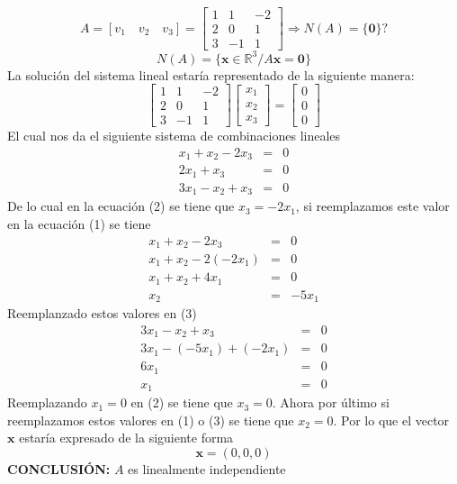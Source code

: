 \[
A = [ {v}_{1} \quad {v}_{2} \quad {v}_{3} ] =
\begin{bmatrix}
1 & 1 & -2 \\ 
2 & 0 & 1 \\
3 & -1 & 1
\end{bmatrix}
\Longrightarrow N(A) = \{ \mathbf{0} \} ?
\]
$$
N(A) = \{ \mathbf{x} \in \mathbb{R}^3 / A \mathbf{x} = \mathbf{0} \}
$$
La solución del sistema lineal estaría representado de la siguiente manera:
\[
\begin{bmatrix}
1 & 1 & -2 \\ 
2 & 0 & 1 \\
3 & -1 & 1
\end{bmatrix}
\begin{bmatrix}
{x}_{1} \\ 
{x}_{2} \\
{x}_{3}
\end{bmatrix} =
\begin{bmatrix}
0 \\ 
0 \\
0
\end{bmatrix}
\]
El cual nos da el siguiente sistema de combinaciones lineales
\setcounter{equation}{0}
\begin{eqnarray}
    {x}_{1} + {x}_{2} - 2{x}_{3} &=& 0 \\
    2{x}_{1} + {x}_{3} &=& 0 \\
    3{x}_{1} - {x}_{2} + {x}_{3} &=& 0
\end{eqnarray}
De lo cual en la ecuación (2) se tiene que ${x}_{3} = -2{x}_{1}$, si reemplazamos este valor en la ecuación (1) se tiene
\begin{eqnarray}
    {x}_{1} + {x}_{2} - 2{x}_{3} &=& 0 \nonumber \\
    {x}_{1} + {x}_{2} - 2(-2{x}_{1}) &=& 0 \nonumber \\
    {x}_{1} + {x}_{2} + 4{x}_{1} &=& 0 \nonumber \\
    {x}_{2} &=& -5{x}_{1} \nonumber
\end{eqnarray}
Reemplanzado estos valores en (3)
\begin{eqnarray}
    3{x}_{1} - {x}_{2} + {x}_{3} &=& 0 \nonumber \\
    3{x}_{1} - (-5{x}_{1}) + (-2{x}_{1}) &=& 0 \nonumber \\
    6{x}_{1} &=& 0 \nonumber \\
    {x}_{1} &=& 0 \nonumber
\end{eqnarray}
Reemplazando ${x}_{1} = 0$ en (2) se tiene que ${x}_{3} = 0$. Ahora por último si reemplazamos estos valores en (1) o (3) se tiene que ${x}_{2} = 0$. Por lo que el vector $\mathbf{x}$ estaría expresado de la siguiente forma
$$
\mathbf{x} = (0, 0, 0)
$$
\textbf{CONCLUSIÓN:} $A$ es linealmente independiente


